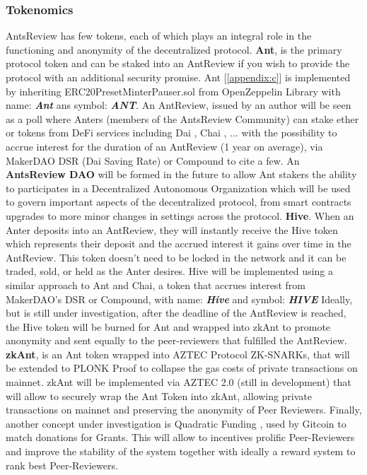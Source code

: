 \documentclass[runningheads]{llncs}
\begin{document}
\subsubsection{Tokenomics}

AntsReview has few tokens, each of which plays an integral role in the functioning and anonymity of the decentralized protocol.
\newline \textbf{Ant}, is the primary protocol token and can be staked into an AntReview if you wish to provide the protocol with an additional security promise.
\newline Ant [\ref{appendix:c}] is implemented by inheriting ERC20PresetMinterPauser.sol from OpenZeppelin Library with name: \textbf{\emph{Ant}} ans symbol: \textbf{\emph{ANT}}.
\newline An AntReview, issued by an author will be seen as a poll where Anters (members of the AntsReview Community) can stake ether or tokens from DeFi services including Dai \cite{Dai}, Chai \cite{Chai}, ... with the possibility to accrue interest for the duration of an AntReview (1 year on average), via MakerDAO DSR (Dai Saving Rate) \cite{DSR} or Compound \cite{Compound} to cite a few.
\newline An \textbf{AntsReview DAO} will be formed in the future to allow Ant stakers the ability to participates in a Decentralized Autonomous Organization which will be used to govern important aspects of the decentralized protocol, from smart contracts upgrades to more minor changes in settings across the protocol.
\newline \textbf{Hive}. When an Anter deposits into an AntReview, they will instantly receive the Hive token which represents their deposit and the accrued interest it gains over time in the AntReview.
\newline This token doesn't need to be locked in the network and it can be traded, sold, or held as the Anter desires.
\newline Hive will be implemented using a similar approach to Ant and Chai, a token that accrues interest from MakerDAO's DSR or Compound, with name: \textbf{\emph{Hive}} and symbol: \textbf{\emph{HIVE}}
\newline Ideally, but is still under investigation, after the deadline of the AntReview is reached, the Hive token will be burned for Ant and wrapped into zkAnt to promote anonymity and sent equally to the peer-reviewers that fulfilled the AntReview.
\newline \textbf{zkAnt}, is an Ant token wrapped into AZTEC Protocol \cite{AZTEC} ZK-SNARKs, that will be extended to PLONK \cite{PLONK} Proof to collapse the gas costs of private transactions on mainnet.
\newline zkAnt will be implemented via AZTEC 2.0 (still in development) that will allow to securely wrap the Ant Token into zkAnt, allowing private transactions on mainnet and preserving the anonymity of Peer Reviewers.
\newline Finally, another concept under investigation is Quadratic Funding \cite{QuadraticFunding}, used by Gitcoin to match donations for Grants. This will allow to incentives prolific Peer-Reviewers and improve the stability of the system together with ideally a reward system to rank best Peer-Reviewers.
\end{document}
